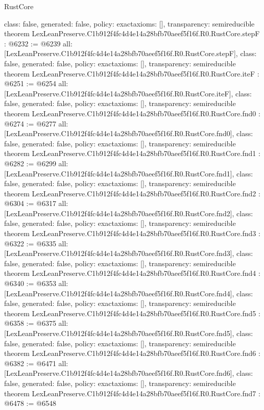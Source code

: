 \begin{lexlean}{RustCore}
\begin{coremodule}
{  class: false,
  generated: false,
  policy: exact{axioms: []},
  transparency: semireducible
}
theorem LexLeanPreserve.C1b912f4fc4d4e14a28bfb70aeef5f16f.R0.RustCore.stepF : @6232 := @6239 {
  all: [LexLeanPreserve.C1b912f4fc4d4e14a28bfb70aeef5f16f.R0.RustCore.stepF],
  class: false,
  generated: false,
  policy: exact{axioms: []},
  transparency: semireducible
}
theorem LexLeanPreserve.C1b912f4fc4d4e14a28bfb70aeef5f16f.R0.RustCore.iteF : @6251 := @6254 {
  all: [LexLeanPreserve.C1b912f4fc4d4e14a28bfb70aeef5f16f.R0.RustCore.iteF],
  class: false,
  generated: false,
  policy: exact{axioms: []},
  transparency: semireducible
}
theorem LexLeanPreserve.C1b912f4fc4d4e14a28bfb70aeef5f16f.R0.RustCore.fnd0 : @6274 := @6277 {
  all: [LexLeanPreserve.C1b912f4fc4d4e14a28bfb70aeef5f16f.R0.RustCore.fnd0],
  class: false,
  generated: false,
  policy: exact{axioms: []},
  transparency: semireducible
}
theorem LexLeanPreserve.C1b912f4fc4d4e14a28bfb70aeef5f16f.R0.RustCore.fnd1 : @6282 := @6299 {
  all: [LexLeanPreserve.C1b912f4fc4d4e14a28bfb70aeef5f16f.R0.RustCore.fnd1],
  class: false,
  generated: false,
  policy: exact{axioms: []},
  transparency: semireducible
}
theorem LexLeanPreserve.C1b912f4fc4d4e14a28bfb70aeef5f16f.R0.RustCore.fnd2 : @6304 := @6317 {
  all: [LexLeanPreserve.C1b912f4fc4d4e14a28bfb70aeef5f16f.R0.RustCore.fnd2],
  class: false,
  generated: false,
  policy: exact{axioms: []},
  transparency: semireducible
}
theorem LexLeanPreserve.C1b912f4fc4d4e14a28bfb70aeef5f16f.R0.RustCore.fnd3 : @6322 := @6335 {
  all: [LexLeanPreserve.C1b912f4fc4d4e14a28bfb70aeef5f16f.R0.RustCore.fnd3],
  class: false,
  generated: false,
  policy: exact{axioms: []},
  transparency: semireducible
}
theorem LexLeanPreserve.C1b912f4fc4d4e14a28bfb70aeef5f16f.R0.RustCore.fnd4 : @6340 := @6353 {
  all: [LexLeanPreserve.C1b912f4fc4d4e14a28bfb70aeef5f16f.R0.RustCore.fnd4],
  class: false,
  generated: false,
  policy: exact{axioms: []},
  transparency: semireducible
}
theorem LexLeanPreserve.C1b912f4fc4d4e14a28bfb70aeef5f16f.R0.RustCore.fnd5 : @6358 := @6375 {
  all: [LexLeanPreserve.C1b912f4fc4d4e14a28bfb70aeef5f16f.R0.RustCore.fnd5],
  class: false,
  generated: false,
  policy: exact{axioms: []},
  transparency: semireducible
}
theorem LexLeanPreserve.C1b912f4fc4d4e14a28bfb70aeef5f16f.R0.RustCore.fnd6 : @6382 := @6471 {
  all: [LexLeanPreserve.C1b912f4fc4d4e14a28bfb70aeef5f16f.R0.RustCore.fnd6],
  class: false,
  generated: false,
  policy: exact{axioms: []},
  transparency: semireducible
}
theorem LexLeanPreserve.C1b912f4fc4d4e14a28bfb70aeef5f16f.R0.RustCore.fnd7 : @6478 := @6548 {
}
\end{coremodule}
\end{lexlean}
